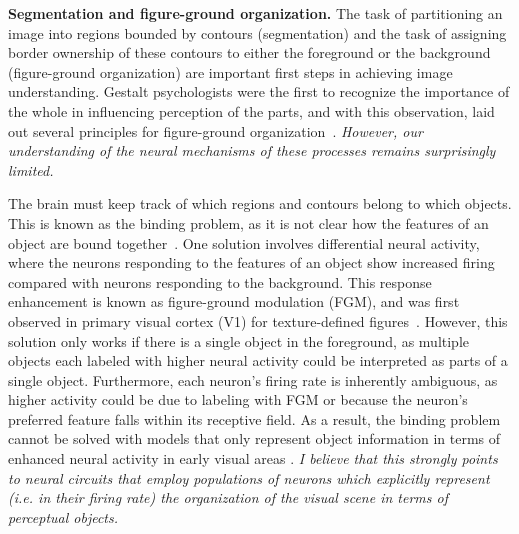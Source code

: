 \documentclass[11pt]{article}
\newcommand{\ie}[0]{{\em i.e.}\xspace}
\begin{document}
\textbf{Segmentation and figure-ground organization.} The task of
partitioning an image into regions bounded by contours (segmentation)
and the task of assigning border ownership of these contours to either
the foreground or the background (figure-ground organization) are
important first steps in achieving image understanding.  Gestalt
psychologists were the first to recognize the importance of the whole
in influencing perception of the parts, and with this observation,
laid out several principles for figure-ground
organization~\citep{Koffka35, Wertheimer23}. \textit{However, our
  understanding of the neural mechanisms of these processes remains
  surprisingly limited.}
 
 The brain must keep track of which regions and contours belong to which objects.
  This is known as the binding problem, as it is not clear how the features of an object are bound together~\citep{Treisman96b}.
 One solution involves differential
neural activity, where the neurons responding to the features of an
object show increased firing compared with neurons responding to the
background.
This response enhancement is known as figure-ground
modulation (FGM), and was first observed in primary visual cortex (V1)
for texture-defined
figures~\citep{Lamme95}.
%
However, this solution only works if there is a single object in the
foreground, as multiple objects each labeled with higher neural
activity could be interpreted as parts of a single
object. Furthermore, each neuron's firing rate is inherently
ambiguous, as higher activity could be due to labeling with FGM or
because the neuron's preferred feature falls within its receptive
field. As a result, the
binding problem cannot be solved 
with models that only represent object information in terms of enhanced neural activity in early visual areas \citep{Niebur00a}. {\em I believe that this strongly points to neural circuits that employ populations of neurons which explicitly represent (\ie in their firing rate) the organization of the visual scene in terms of perceptual objects.}
\end{document}
